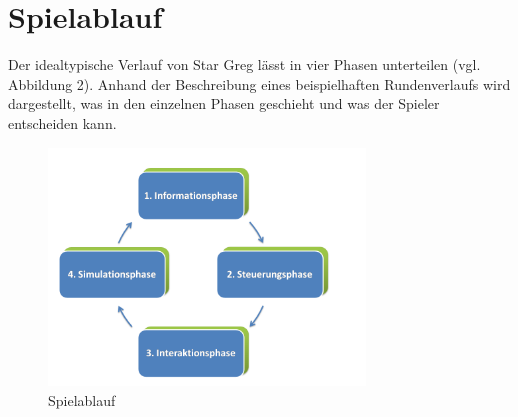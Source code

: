 \section{Spielablauf}
\label{sec:spielwelt-regeln}


Der idealtypische Verlauf von Star Greg lässt in vier Phasen unterteilen (vgl. Abbildung 2). Anhand der Beschreibung eines beispielhaften Rundenverlaufs wird dargestellt, was in den einzelnen Phasen geschieht und was der Spieler entscheiden kann.

\begin{figure}[h]
\centering
\includegraphics[width=0.75\textwidth]{20_Spielwelt/40_Regeln_Ablauf/Spielablauf.png}
\caption{Spielablauf}
\end{figure}









\autorende{}